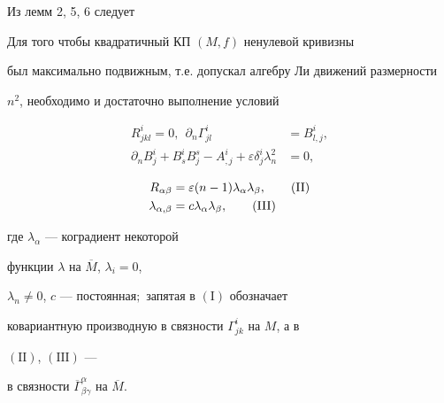 Из лемм 2, 5, 6 следует





\begin{thm}


Для того чтобы квадратичный КП $(M,f) $ ненулевой кривизны


был максимально подвижным, т.е. допускал алгебру Ли движений размерности


$n^2$, необходимо и достаточно выполнение условий


\begin{equation}


\begin{split}


R^{i}_{jkl}=0,\ \ \partial_n \Gamma^i_{jl}&=B^i_{l,j},\\


\partial_n B^i_{j}+B^i_{s } B^s_{j}-A^i_{,j}


+\varepsilon \delta^i_{j}\lambda^2_n&=0,


\end{split}


\tag{$\mathrm I$}


\end{equation}


\begin{align}


R_{\alpha \beta }&=\varepsilon(n-1)\lambda_{\alpha}\lambda_{\beta},


\tag{$\mathrm{II}$}\\


\lambda_{\alpha, \beta }&=c\lambda_{\alpha}\lambda_{\beta},


\tag{$\mathrm{III}$}


\end{align}


где $\lambda_{\alpha}$ --- коградиент некоторой


функции $\lambda $ на $\overline{M} $, $\lambda_i=0$,


$\lambda_n\neq 0$, $c$ --- постоянная\/$;$ запятая в $\mathrm{(I)}$ обозначает


ковариантную производную в связности $\Gamma^i_{jk}$ на $M$, а в


$\mathrm{(II)}$, $\mathrm{(III)}$ ---


в связности $\overline{\Gamma}^{\alpha}_{\beta


\gamma} $ на $\overline{M} $.


\end{thm}


